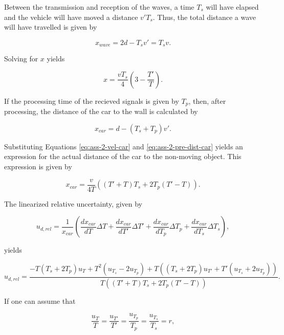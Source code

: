 \documentclass[11pt,titlepage]{report}
\begin{document}
Between the transmission and reception of the waves, a time $T_s$ will have elapsed and the vehicle will have moved a distance $v' T_s$. Thus, the total distance a wave will have travelled is given by

\begin{equation}
	x_{wave} = 2 d - T_s v' = T_s v.
\end{equation}

Solving for $x$ yields

\begin{equation} \label{eq:ass-2-pre-dist-car}
	x = \frac{v T_s}{4} \left(3 - \frac{T'}{T} \right).
\end{equation}

If the processing time of the recieved signals is given by $T_p$, then, after processing, the distance of the car to the wall is calculated by

\begin{equation}
	x_{car} = d-(T_s +T_p) v'.
\end{equation}

Substituting Equations \ref{eq:ass-2-vel-car} and \ref{eq:ass-2-pre-dist-car} yields an expression for the actual distance of the car to the non-moving object. This expression is given by

\begin{equation}
	x_{car} = \frac{v}{4 T} \left((T'+T) T_s + 2 T_p (T'-T)  \right).
\end{equation}

The linearized relative uncertainty, given by

\begin{equation}
	u_{d,rel} = \frac{1}{x_{car}} \left( \frac{d x_{car}}{d T} \Delta T + \frac{d x_{car}}{d T'} \Delta T' + \frac{d x_{car}}{d T_p} \Delta T_p + \frac{d x_{car}}{d T_s} \Delta T_s \right),
\end{equation}

yields

\begin{equation}
	u_{d,rel} = \frac{
		-T(T_s + 2 T_p) u_T + T^2 (u_{T_s} - 2 u_{T_p}) + T \left( (T_s + 2 T_p) u_{T'} + T' (u_{T_s} + 2 u_{T_p}) \right)
	}{
		T \left( (T'+T)T_s + 2 T_p (T'-T) \right)
	}.
\end{equation}

If one can assume that

\begin{equation}
	\frac{u_T}{T} = \frac{u_{T'}}{T'} = \frac{u_{T_p}}{T_p} = \frac{u_{T_s}}{T_s}=r,
\end{equation}
\end{document}
